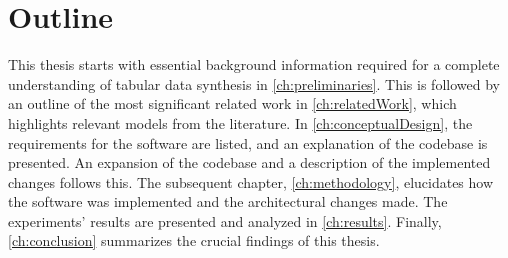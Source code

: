 \newpage
\section{Outline}
\label{ch:intro-outline}

This thesis starts with essential background information required for a complete understanding of tabular data synthesis in \autoref{ch:preliminaries}.
This is followed by an outline of the most significant related work in \autoref{ch:relatedWork}, which highlights relevant models from the literature.
In \autoref{ch:conceptualDesign}, the requirements for the software are listed, and an explanation of the codebase is presented. 
An expansion of the codebase and a description of the implemented changes follows this. 
The subsequent chapter, \autoref{ch:methodology}, elucidates how the software was implemented and the architectural changes made.
The experiments' results are presented and analyzed in \autoref{ch:results}. 
Finally, \autoref{ch:conclusion} summarizes the crucial findings of this thesis.